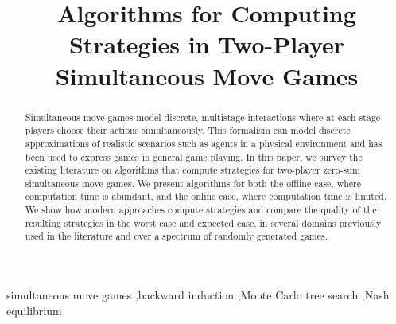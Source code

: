 \documentclass[preprint,12pt]{elsarticle}
\begin{document}
\begin{frontmatter}



\title{Algorithms for Computing Strategies in Two-Player Simultaneous Move Games}


\author{}

\address{}

\begin{abstract}
Simultaneous move games model discrete, multistage interactions where at each stage 
players choose their actions simultaneously. This formalism can model discrete 
approximations of realistic scenarios such as agents in a physical environment and 
has been used to express games in general game playing. 
In this paper, we survey the existing literature on algorithms that compute strategies
for two-player zero-sum simultaneous move games.
We present algorithms for both the offline case, where computation time is abundant, and 
the online case, where computation time is limited. 
We show how modern approaches compute strategies and compare the quality of the resulting
strategies in the worst case and expected case, in several 
domains previously used in the literature and over a spectrum of randomly generated games. 
\end{abstract}

\begin{keyword}
simultaneous move games \sep backward induction \sep Monte Carlo tree search \sep Nash equilibrium

\end{keyword}

\end{frontmatter}
\end{document}
